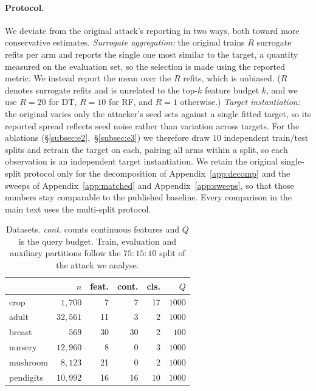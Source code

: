 \documentclass[sigconf,anonymous,review]{acmart}
\begin{document}
\paragraph{Protocol.} We deviate from the original attack's reporting in two ways, both toward more
conservative estimates. \emph{Surrogate aggregation:} the original trains $R$ surrogate refits per
arm and reports the single one most similar to the target, a quantity measured on the evaluation set,
so the selection is made using the reported metric. We instead report the mean over the $R$ refits,
which is unbiased. ($R$ denotes surrogate refits and is unrelated to the top-$k$ feature budget $k$, and we use $R{=}20$ for DT, $R{=}10$ for RF, and $R{=}1$ otherwise.)
\emph{Target instantiation:} the original varies only the attacker's seed sets against a single fitted
target, so its reported spread reflects seed noise rather than variation across targets. For the
ablations (\S\ref{subsec:e2},~\S\ref{subsec:e3}) we therefore draw $10$ independent train/test splits
and retrain the target on each, pairing all arms within a split, so each observation is an independent
target instantiation. 
We retain the original single-split protocol only for the decomposition of
Appendix~\ref{app:decomp} and the sweeps of Appendix~\ref{app:matched} and
Appendix~\ref{app:sweeps}, so that those numbers stay comparable to the published baseline. Every comparison in the main text uses the multi-split protocol. 

\begin{table}[t]
\centering
\caption{Datasets. \emph{cont.} counts continuous features and $Q$ is the query budget. Train, evaluation
and auxiliary partitions follow the $75\!:\!15\!:\!10$ split of the attack we analyse.}
\label{tab:datasets}
\begin{tabular}{lrrrrr}
\toprule
 & $n$ & feat. & cont. & cls. & $Q$ \\
\midrule
crop      & $1{,}700$  & 7  & 7  & 17 & $1000$ \\
adult     & $32{,}561$ & 11 & 3  & 2  & $1000$ \\
breast    & $569$      & 30 & 30 & 2  & $100$  \\
nursery   & $12{,}960$ & 8  & 0  & 3  & $1000$ \\
mushroom  & $8{,}123$  & 21 & 0  & 2  & $1000$ \\
pendigits & $10{,}992$ & 16 & 16 & 10 & $1000$ \\
\bottomrule
\end{tabular}
\end{table}
\end{document}
